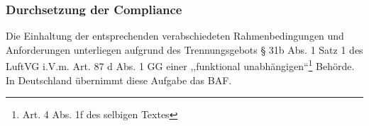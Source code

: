 



\pagebreak
\subsubsection{Durchsetzung der Compliance}

    Die Einhaltung der entsprechenden verabschiedeten Rahmenbedingungen und Anforderungen unterliegen aufgrund des Trennungsgebots § 31b Abs. 1 Satz 1 des \ac{LuftVG} i.V.m. Art. 87 d Abs. 1 \ac{GG} einer ,,funktional unabhängigen``\footnote{Art. 4 Abs. 1f des selbigen Textes} Behörde. \cite[S. 14]{eu_ses_studie} 
    In Deutschland übernimmt diese Aufgabe das \acf{BAF}.





